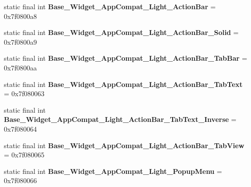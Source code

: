 \begin{DoxyCompactItemize}
\item 
\hypertarget{classandroid_1_1support_1_1v7_1_1appcompat_1_1_r_1_1style_a312f41634ed7c5c1ed7363e934bbd4df}{}static final int {\bfseries Base\+\_\+\+Widget\+\_\+\+App\+Compat\+\_\+\+Light\+\_\+\+Action\+Bar} = 0x7f0800a8\label{classandroid_1_1support_1_1v7_1_1appcompat_1_1_r_1_1style_a312f41634ed7c5c1ed7363e934bbd4df}

\item 
\hypertarget{classandroid_1_1support_1_1v7_1_1appcompat_1_1_r_1_1style_afe2f5b048e0567f29091d3f83d5fbf04}{}static final int {\bfseries Base\+\_\+\+Widget\+\_\+\+App\+Compat\+\_\+\+Light\+\_\+\+Action\+Bar\+\_\+\+Solid} = 0x7f0800a9\label{classandroid_1_1support_1_1v7_1_1appcompat_1_1_r_1_1style_afe2f5b048e0567f29091d3f83d5fbf04}

\item 
\hypertarget{classandroid_1_1support_1_1v7_1_1appcompat_1_1_r_1_1style_a8d592bd0919bb0c93d0dfdcdf87b9364}{}static final int {\bfseries Base\+\_\+\+Widget\+\_\+\+App\+Compat\+\_\+\+Light\+\_\+\+Action\+Bar\+\_\+\+Tab\+Bar} = 0x7f0800aa\label{classandroid_1_1support_1_1v7_1_1appcompat_1_1_r_1_1style_a8d592bd0919bb0c93d0dfdcdf87b9364}

\item 
\hypertarget{classandroid_1_1support_1_1v7_1_1appcompat_1_1_r_1_1style_aafd59f0c3cf68cf0449532c814c75409}{}static final int {\bfseries Base\+\_\+\+Widget\+\_\+\+App\+Compat\+\_\+\+Light\+\_\+\+Action\+Bar\+\_\+\+Tab\+Text} = 0x7f080063\label{classandroid_1_1support_1_1v7_1_1appcompat_1_1_r_1_1style_aafd59f0c3cf68cf0449532c814c75409}

\item 
\hypertarget{classandroid_1_1support_1_1v7_1_1appcompat_1_1_r_1_1style_ae38a524df3514da4bd318b3c6d375194}{}static final int {\bfseries Base\+\_\+\+Widget\+\_\+\+App\+Compat\+\_\+\+Light\+\_\+\+Action\+Bar\+\_\+\+Tab\+Text\+\_\+\+Inverse} = 0x7f080064\label{classandroid_1_1support_1_1v7_1_1appcompat_1_1_r_1_1style_ae38a524df3514da4bd318b3c6d375194}

\item 
\hypertarget{classandroid_1_1support_1_1v7_1_1appcompat_1_1_r_1_1style_aac1ceb67855c4caadba59914e549affe}{}static final int {\bfseries Base\+\_\+\+Widget\+\_\+\+App\+Compat\+\_\+\+Light\+\_\+\+Action\+Bar\+\_\+\+Tab\+View} = 0x7f080065\label{classandroid_1_1support_1_1v7_1_1appcompat_1_1_r_1_1style_aac1ceb67855c4caadba59914e549affe}

\item 
\hypertarget{classandroid_1_1support_1_1v7_1_1appcompat_1_1_r_1_1style_a50f811d977ea50bc76491f4c9261b8c0}{}static final int {\bfseries Base\+\_\+\+Widget\+\_\+\+App\+Compat\+\_\+\+Light\+\_\+\+Popup\+Menu} = 0x7f080066\label{classandroid_1_1support_1_1v7_1_1appcompat_1_1_r_1_1style_a50f811d977ea50bc76491f4c9261b8c0}


\end{DoxyCompactItemize}
